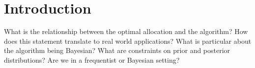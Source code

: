 \newcommand{\package}{\emph}

\chapter{Introduction}

What is the relationship between the optimal allocation and the algorithm?
How does this statement translate to real world applications?
What is particular about the algorithm being Bayesian?
What are constraints on prior and posterior distributions?
Are we in a frequentist or Bayesian setting?
